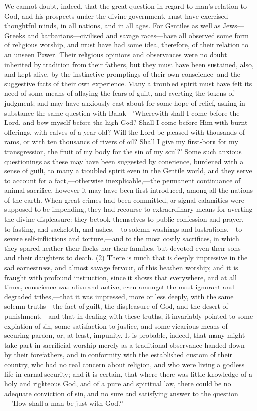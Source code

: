 \documentclass[
]{book}
\begin{document}
We cannot doubt, indeed, that the great question in regard to man's relation to God, and his prospects under the divine government, must have exercised thoughtful minds, in all nations, and in all ages. For Gentiles as well as Jews---Greeks and barbarians---civilised and savage races---have all observed some form of religious worship, and must have had some idea, therefore, of their relation to an unseen Power. Their religious opinions and observances were no doubt inherited by tradition from their fathers, but they must have been sustained, also, and kept alive, by the instinctive promptings of their own conscience, and the suggestive facts of their own experience. Many a troubled spirit must have felt its need of some means of allaying the fears of guilt, and averting the tokens of judgment; and may have anxiously cast about for some hope of relief, asking in substance the same question with Balak---'Wherewith shall I come before the Lord, and bow myself before the high God? Shall I come before Him with burnt-offerings, with calves of a year old? Will the Lord be pleased with thousands of rams, or with ten thousands of rivers of oil? Shall I give my first-born for my transgression, the fruit of my body for the sin of my soul?' Some such anxious questionings as these may have been suggested by conscience, burdened with a sense of guilt, to many a troubled spirit even in the Gentile world, and they serve to account for a fact,---otherwise inexplicable,---the permanent continuance of animal sacrifice, however it may have been first introduced, among all the nations of the earth. When great crimes had been committed, or signal calamities were supposed to be impending, they had recourse to extraordinary means for averting the divine displeasure: they betook themselves to public confession and prayer,---to fasting, and sackcloth, and ashes,---to solemn washings and lustrations,---to severe self-inflictions and torture,---and to the most costly sacrifices, in which they spared neither their flocks nor their families, but devoted even their sons and their daughters to death. (2) There is much that is deeply impressive in the sad earnestness, and almost savage fervour, of this heathen worship; and it is fraught with profound instruction, since it shows that everywhere, and at all times, conscience was alive and active, even amongst the most ignorant and degraded tribes,---that it was impressed, more or less deeply, with the same solemn truths---the fact of guilt, the displeasure of God, and the desert of punishment,---and that in dealing with these truths, it invariably pointed to some expiation of sin, some satisfaction to justice, and some vicarious means of securing pardon, or, at least, impunity. It is probable, indeed, that many might take part in sacrificial worship merely as a traditional observance handed down by their forefathers, and in conformity with the established custom of their country, who had no real concern about religion, and who were living a godless life in carnal security; and it is certain, that where there was little knowledge of a holy and righteous God, and of a pure and spiritual law, there could be no adequate conviction of sin, and no sure and satisfying answer to the question---'How shall a man be just with God?'
\end{document}
